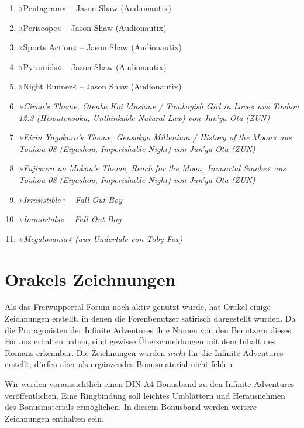 \begin{enumerate}
    \item »Pentagram« – Jason Shaw (Audionautix)
    \item »Periscope« – Jason Shaw (Audionautix)
    \item »Sports Action« – Jason Shaw (Audionautix)
    \item »Pyramids« – Jason Shaw (Audionautix)    
    \item »Night Runner« – Jason Shaw (Audionautix)
    \item \textit{»Cirno's Theme, Otenba Koi Musume / Tomboyish Girl in Love« aus Touhou 12.3 (Hisoutensoku, Unthinkable Natural Law) von Jun'ya Ota (ZUN)}
    \item \textit{»Eirin Yagokoro's Theme, Gensokyo Millenium / History of the Moon« aus Touhou 08 (Eiyashou, Imperishable Night) von Jun'ya Ota (ZUN)}
    \item \textit{»Fujiwara no Mokou's Theme, Reach for the Moon, Immortal Smoke« aus Touhou 08 (Eiyashou, Imperishable Night) von Jun'ya Ota (ZUN)}
    \item \textit{»Irresistible« – Fall Out Boy}
    \item \textit{»Immortals«  – Fall Out Boy}
    \item \textit{»Megalovania« (aus Undertale von Toby Fox)}

\end{enumerate}




\chapter{Orakels Zeichnungen}

Als das Freiwuppertal-Forum noch aktiv genutzt wurde, hat Orakel einige Zeichnungen erstellt, in denen die Forenbenutzer satirisch dargestellt wurden. Da die Protagonisten der Infinite Adventures ihre Namen von den Benutzern dieses Forums erhalten haben, sind gewisse Überschneidungen mit dem Inhalt des Romans erkennbar. Die Zeichnungen wurden \textit{nicht} für die Infinite Adventures erstellt, dürfen aber als ergänzendes Bonusmaterial nicht fehlen.

Wir werden voraussichtlich einen DIN-A4-Bonusband zu den Infinite Adventures veröffentlichen. Eine Ringbindung soll leichtes Umblättern und Herausnehmen des Bonusmaterials ermöglichen. In diesem Bonusband werden weitere Zeichnungen enthalten sein.

